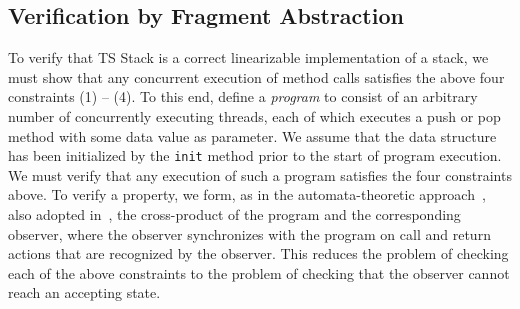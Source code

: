 \subsection{Verification by Fragment Abstraction}
To verify that TS Stack is a correct linearizable implementation of a stack, we
must show that any concurrent execution of method calls satisfies the
above four constraints (1) -- (4).
To this end, define a {\em program} to consist 
of an arbitrary number of concurrently executing threads,
%
each of which executes a push or pop method with some data value as parameter.
We assume that the data structure has been initialized
by the {\tt init} method prior to the start of program execution.
We must verify that any execution of such a program satisfies the four
constraints above. To verify a property, 
we form, as in the automata-theoretic approach~\cite{VW:modelchecking},
also adopted in~\cite{AHHR:integrated},
the cross-product of the program  and the corresponding
observer, where the observer synchronizes with the program on call and
return actions that are recognized by the observer. This reduces the
problem of checking each of the above constraints to the problem of checking
that the observer cannot reach an accepting state.


